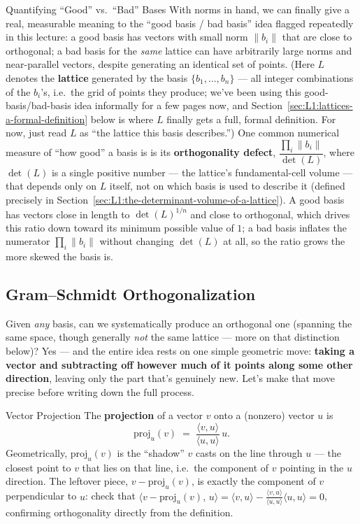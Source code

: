\begin{previewbox}{Quantifying ``Good'' vs.\ ``Bad'' Bases}
With norms in hand, we can finally give a real, measurable meaning to the ``good basis / bad basis'' idea flagged repeatedly in this lecture: a good basis has vectors with small norm $\|b_i\|$ that are close to orthogonal; a bad basis for the \emph{same} lattice can have arbitrarily large norms and near-parallel vectors, despite generating an identical set of points. (Here $L$ denotes the \textbf{lattice} generated by the basis $\{b_1,\ldots,b_n\}$ --- all integer combinations of the $b_i$'s, i.e.\ the grid of points they produce; we've been using this good-basis/bad-basis idea informally for a few pages now, and Section~\ref{sec:L1:lattices-a-formal-definition} below is where $L$ finally gets a full, formal definition. For now, just read $L$ as ``the lattice this basis describes.'') One common numerical measure of ``how good'' a basis is is its \textbf{orthogonality defect}, $\dfrac{\prod_i \|b_i\|}{\det(L)}$, where $\det(L)$ is a single positive number --- the lattice's fundamental-cell volume --- that depends only on $L$ itself, not on which basis is used to describe it (defined precisely in Section~\ref{sec:L1:the-determinant-volume-of-a-lattice}). A good basis has vectors close in length to $\det(L)^{1/n}$ and close to orthogonal, which drives this ratio down toward its minimum possible value of $1$; a bad basis inflates the numerator $\prod_i\|b_i\|$ without changing $\det(L)$ at all, so the ratio grows the more skewed the basis is.
\end{previewbox}

\subsection{Gram--Schmidt Orthogonalization}
\label{sec:L1:gram-schmidt-orthogonalization}

Given \emph{any} basis, can we systematically produce an orthogonal one (spanning the same space, though generally \emph{not} the same lattice --- more on that distinction below)? Yes --- and the entire idea rests on one simple geometric move: \textbf{taking a vector and subtracting off however much of it points along some other direction}, leaving only the part that's genuinely new. Let's make that move precise before writing down the full process.

\begin{defbox}{Vector Projection}
The \textbf{projection} of a vector $v$ onto a (nonzero) vector $u$ is
$$
\mathrm{proj}_u(v) \;=\; \frac{\langle v,u \rangle}{\langle u,u \rangle}\, u.
$$
Geometrically, $\mathrm{proj}_u(v)$ is the ``shadow'' $v$ casts on the line through $u$ --- the closest point to $v$ that lies on that line, i.e.\ the component of $v$ pointing in the $u$ direction. The leftover piece, $v - \mathrm{proj}_u(v)$, is exactly the component of $v$ perpendicular to $u$: check that $\langle v - \mathrm{proj}_u(v),\, u\rangle = \langle v,u\rangle - \frac{\langle v,u\rangle}{\langle u,u\rangle}\langle u,u\rangle = 0$, confirming orthogonality directly from the definition.
\end{defbox}

